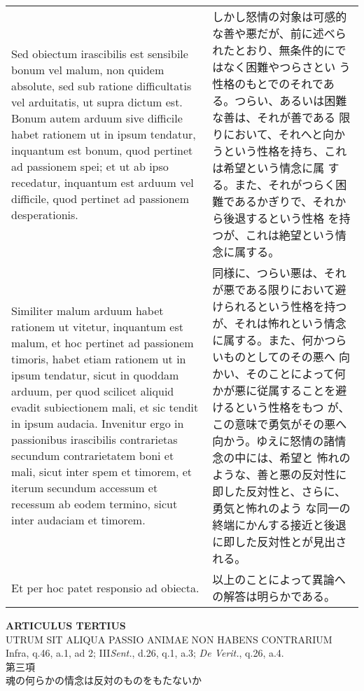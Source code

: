 \documentclass[10pt]{jsarticle} %
\begin{document}
\begin{longtable}{p{21em}p{21em}}
\\


Sed obiectum irascibilis est sensibile bonum
vel malum, non quidem absolute, sed sub ratione difficultatis vel
arduitatis, ut supra dictum est. Bonum autem arduum sive difficile habet
rationem ut in ipsum tendatur, inquantum est bonum, quod pertinet ad
passionem spei; et ut ab ipso recedatur, inquantum est arduum vel
difficile, quod pertinet ad passionem desperationis. 


&

しかし怒情の対象は可感的な善や悪だが、前に述べられたとおり、無条件的にではなく困難やつらさとい
 う性格のもとでのそれである。つらい、あるいは困難な善は、それが善である
 限りにおいて、それへと向かうという性格を持ち、これは希望という情念に属
 する。また、それがつらく困難であるかぎりで、それから後退するという性格
 を持つが、これは絶望という情念に属する。

\\

Similiter malum
arduum habet rationem ut vitetur, inquantum est malum, et hoc pertinet
ad passionem timoris, habet etiam rationem ut in ipsum tendatur, sicut
in quoddam arduum, per quod scilicet aliquid evadit subiectionem mali,
et sic tendit in ipsum audacia. Invenitur ergo in passionibus
irascibilis contrarietas secundum contrarietatem boni et mali, sicut
inter spem et timorem, et iterum secundum accessum et recessum ab eodem
termino, sicut inter audaciam et timorem.


&

同様に、つらい悪は、それが悪である限りにおいて避けられるという性格を持つ
 が、それは怖れという情念に属する。また、何かつらいものとしてのその悪へ
 向かい、そのことによって何かが悪に従属することを避けるという性格をもつ
 が、この意味で勇気がその悪へ向かう。ゆえに怒情の諸情念の中には、希望と
 怖れのような、善と悪の反対性に即した反対性と、さらに、勇気と怖れのよう
 な同一の終端にかんする接近と後退に即した反対性とが見出される。

\\


Et per hoc patet responsio ad obiecta.

&

以上のことによって異論への解答は明らかである。

\end{longtable}
\newpage


\begin{center}
{\Large {\bf ARTICULUS TERTIUS}}\\
{\large UTRUM SIT ALIQUA PASSIO ANIMAE NON HABENS CONTRARIUM}\\
{\footnotesize Infra, q.46, a.1, ad 2; III{\itshape Sent.}, d.26, q.1,
 a.3; {\itshape De Verit.}, q.26, a.4.}\\
{\Large 第三項\\魂の何らかの情念は反対のものをもたないか}
\end{center}
\end{document}
